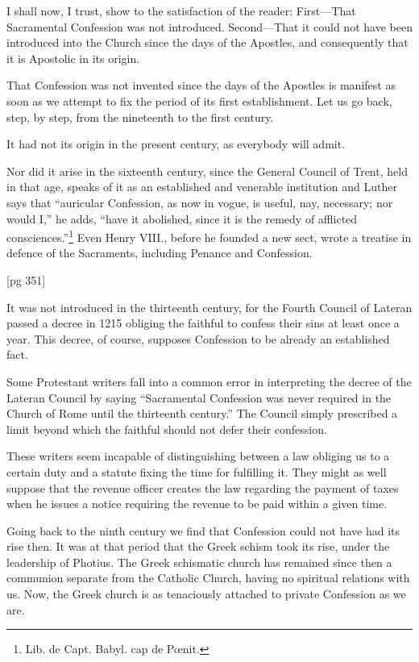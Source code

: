 I shall now, I trust, show to the satisfaction of
the reader: First—That Sacramental Confession
was not introduced. Second—That it could not
have been introduced into the Church since the
days of the Apostles, and consequently that it is
Apostolic in its origin.

That Confession was not invented since the days
of the Apostles is manifest as soon as we attempt
to fix the period of its first establishment. Let us
go back, step, by step, from the nineteenth to the
first century.

It had not its origin in the present century, as
everybody will admit.

Nor did it arise in the sixteenth century, since
the General Council of Trent, held in that age,
speaks of it as an established and venerable institution
and Luther says that “auricular Confession,
as now in vogue, is useful, nay, necessary;
nor would I,” he adds, “have it abolished, since it
is the remedy of afflicted consciences.”\footnote{Lib.
de Capt. Babyl. cap de Pœnit.} Even
Henry VIII., before he founded a new sect, wrote
a treatise in defence of the Sacraments, including
Penance and Confession.

[pg 351]

It was not introduced in the thirteenth century,
for the Fourth Council of Lateran passed a decree
in 1215 obliging the faithful to confess their sins
at least once a year. This decree, of course, supposes
Confession to be already an established fact.

Some Protestant writers fall into a common
error in interpreting the decree of the Lateran
Council by saying “Sacramental Confession was
never required in the Church of Rome until the
thirteenth century.” The Council simply prescribed
a limit beyond which the faithful should
not defer their confession.

These writers seem incapable of distinguishing
between a law obliging us to a certain duty and a
statute fixing the time for fulfilling it. They might
as well suppose that the revenue officer creates the
law regarding the payment of taxes when he issues
a notice requiring the revenue to be paid within a
given time.

Going back to the ninth century we find that
Confession could not have had its rise then. It
was at that period that the Greek schism took its
rise, under the leadership of Photius. The Greek
schismatic church has remained since then a communion
separate from the Catholic Church, having
no spiritual relations with us. Now, the Greek
church is as tenaciously attached to private Confession
as we are.

